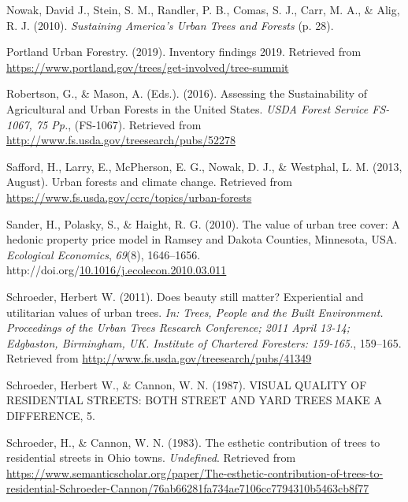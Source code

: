 \documentclass[12pt,twoside]{reedthesis}
\newlength{\cslhangindent}
\newenvironment{CSLReferences}[2] %
 {%
  \setlength{\parindent}{0pt}
  \ifodd #1 \everypar{\setlength{\hangindent}{\cslhangindent}}\ignorespaces\fi
  \ifnum #2 > 0
  \setlength{\parskip}{#2\baselineskip}
  \fi
 }%
 {}
\begin{document}
\begin{CSLReferences}{1}{0}
\leavevmode{}%
Nowak, David J., Stein, S. M., Randler, P. B., Comas, S. J., Carr, M. A., \& Alig, R. J. (2010). \emph{Sustaining America{'}s Urban Trees and Forests} (p. 28).

\leavevmode{}%
Portland Urban Forestry. (2019). Inventory findings 2019. Retrieved from \url{https://www.portland.gov/trees/get-involved/tree-summit}

\leavevmode{}%
Robertson, G., \& Mason, A. (Eds.). (2016). Assessing the Sustainability of Agricultural and Urban Forests in the United States. \emph{USDA Forest Service FS-1067, 75 Pp.}, (FS-1067). Retrieved from \url{http://www.fs.usda.gov/treesearch/pubs/52278}

\leavevmode{}%
Safford, H., Larry, E., McPherson, E. G., Nowak, D. J., \& Westphal, L. M. (2013, August). Urban forests and climate change. Retrieved from \url{https://www.fs.usda.gov/ccrc/topics/urban-forests}

\leavevmode{}%
Sander, H., Polasky, S., \& Haight, R. G. (2010). The value of urban tree cover: A hedonic property price model in Ramsey and Dakota Counties, Minnesota, USA. \emph{Ecological Economics}, \emph{69}(8), 1646--1656. http://doi.org/\href{https://doi.org/10.1016/j.ecolecon.2010.03.011}{10.1016/j.ecolecon.2010.03.011}

\leavevmode{}%
Schroeder, Herbert W. (2011). Does beauty still matter? Experiential and utilitarian values of urban trees. \emph{In: Trees, People and the Built Environment. Proceedings of the Urban Trees Research Conference; 2011 April 13-14; Edgbaston, Birmingham, UK. Institute of Chartered Foresters: 159-165.}, 159--165. Retrieved from \url{http://www.fs.usda.gov/treesearch/pubs/41349}

\leavevmode{}%
Schroeder, Herbert W., \& Cannon, W. N. (1987). VISUAL QUALITY OF RESIDENTIAL STREETS: BOTH STREET AND YARD TREES MAKE A DIFFERENCE, 5.

\leavevmode{}%
Schroeder, H., \& Cannon, W. N. (1983). The esthetic contribution of trees to residential streets in Ohio towns. \emph{Undefined}. Retrieved from \url{https://www.semanticscholar.org/paper/The-esthetic-contribution-of-trees-to-residential-Schroeder-Cannon/76ab66281fa734ae7106cc7794310b5463cb8f77}


\end{CSLReferences}
\end{document}
